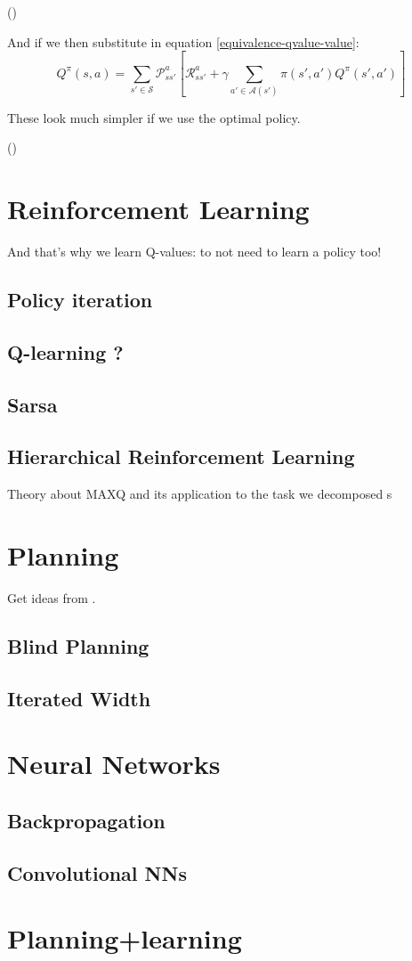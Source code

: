 (\cite[Section~3.7]{sutton1998introduction})

And if we then substitute in equation \ref{equivalence-qvalue-value}:
\begin{equation}
  Q^\pi(s, a) = \sum_{s' \in \mathcal{S}}\mathcal{P}^a_{ss'}
    \left[\mathcal{R}^a_{ss'} + \gamma \sum_{a'\in\mathcal{A}(s')}\pi(s', a')Q^\pi(s', a') \right]
\end{equation}


These look much simpler if we use the optimal policy.

(\cite[Section~17.2.1]{russell2009aima})



\section{Reinforcement Learning}
And that's why we learn Q-values: to not need to learn a policy too!

\subsection{Policy iteration}
\subsection{Q-learning ?}
\subsection{Sarsa}
\subsection{Hierarchical Reinforcement Learning\label{section:hierarchical-rl}}
Theory about MAXQ and its application to the task we decomposed
s
\section{Planning}

Get ideas from \cite{russell2009aima}.

\subsection{Blind Planning}
\subsection{Iterated Width}

\section{Neural Networks}
\subsection{Backpropagation}
\subsection{Convolutional NNs}

\section{Planning+learning}



